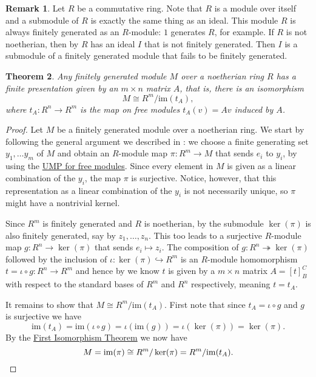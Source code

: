 \documentclass[12pt]{report}
\newtheorem{theorem}{Theorem}[chapter]
\numberwithin{equation}{section}
\numberwithin{theorem}{chapter}
\theoremstyle{definition}
\newtheorem*{basic properties}{Basic Properties}
\newtheorem*{Important Remark}{Important Remark}
\newtheorem{remark}[theorem]{Remark}
\renewcommand{\ker}{\operatorname{ker}}
\begin{document}
\begin{remark}
Let $R$ be a commutative ring. Note that $R$ is a module over itself and a submodule of $R$ is exactly the same thing as an ideal. This module $R$ is always finitely generated as an $R$-module: $1$ generates $R$, for example. If $R$ is not noetherian, then by  $R$ has an ideal $I$ that is not finitely generated. Then $I$ is a submodule of a finitely generated module that fails to be finitely generated.
\end{remark}






\begin{theorem}\label{presentations}
Any finitely generated module $M$ over a noetherian ring $R$ has a finite presentation given by an $m \times n$ matrix $A$, that is, there is an isomorphism
$$M\cong R^m/\mathrm{im}(t_A),$$
where $t_A\!: R^n \to R^m$ is the map on free modules $t_A(v)=Av$ induced by $A$.
\end{theorem}

\begin{proof}
Let $M$ be a finitely generated module over a noetherian ring. We start by following the general argument we described in : we choose a finite generating set $y_1, \dots y_m$ of $M$ and obtain an $R$-module map
$\pi\!: R^m \to M$
that sends $e_i$ to $y_i$, by using the \hyperref[UMPfreemod]{UMP for free modules}. Since every element in $M$ is given as a linear combination of the $y_i$, the map $\pi$ is surjective. Notice, however, that this representation as a linear combination of the $y_i$ is not necessarily unique, so $\pi$ might have a nontrivial kernel. 

Since $R^m$ is finitely generated and $R$ is noetherian, by  the submodule $\ker(\pi)$ is also finitely generated, say by $z_1, \dots, z_n$. This too leads to a
surjective $R$-module map $g\!: R^n \to \ker(\pi)$ that sends $e_i \mapsto z_i$. 
The composition of $g\!: R^n \twoheadrightarrow \ker(\pi)$ followed by the inclusion of $\iota\!: \ker(\pi) \hookrightarrow R^m$ is an $R$-module homomorphism $t=\iota \circ g:R^n \to R^m$ and hence by  we know $t$ is given by a $m \times n$ matrix $A=[t]_B^C$ with respect to the standard bases of $R^m$ and $R^n$ respectively, meaning $t=t_A$. 

It remains to show that $M\cong R^m/\mathrm{im}(t_A)$. First note that since $t_A=\iota \circ g$ and $g$ is surjective we have 
$$\mathrm{im}(t_A)=\mathrm{im}(\iota \circ g)=\iota(\mathrm{im}(g))=\iota(\ker(\pi))=\ker(\pi).$$ 
By the \hyperref[first iso thm]{First Isomorphism Theorem} we now have 
$$M = \mathrm{im}(\pi)\cong R^m/\ker(\pi)= R^m/\mathrm{im}(t_A).\qedhere$$
\end{proof}
\end{document}
